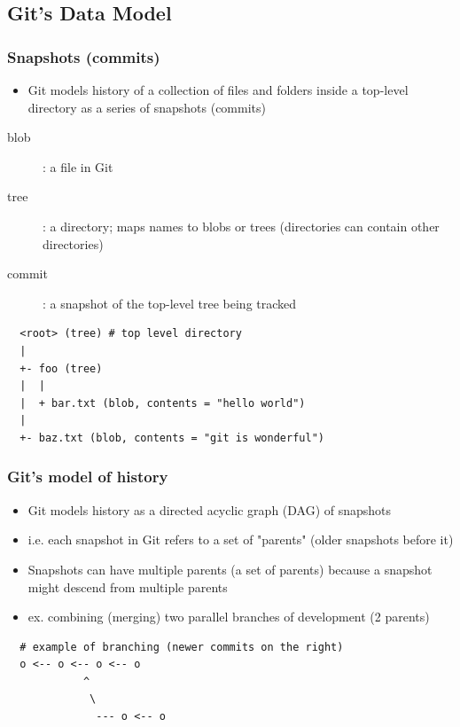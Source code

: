 \documentclass[letterpaper,12pt]{article}
\begin{document}
\subsection{Git's Data Model}

\subsubsection{Snapshots (commits)}
\begin{itemize}
 \item Git models history of a collection of files and folders inside a top-level directory as a series of snapshots (commits)
\end{itemize}

\begin{description}
 \item[blob]: a file in Git
 \item[tree]: a directory; maps names to blobs or trees (directories can contain other directories)
 \item[commit]: a snapshot of the top-level tree being tracked
\end{description}

\begin{lstlisting}
  <root> (tree) # top level directory
  |
  +- foo (tree)
  |  |
  |  + bar.txt (blob, contents = "hello world")
  |
  +- baz.txt (blob, contents = "git is wonderful")
\end{lstlisting}

\subsubsection{Git's model of history}
\begin{itemize}
 \item Git models history as a directed acyclic graph (DAG) of snapshots
 \item i.e. each snapshot in Git refers to a set of "parents" (older snapshots before it)
 \item Snapshots can have multiple parents (a set of parents) because a snapshot might descend from multiple parents
 \item ex. combining (merging) two parallel branches of development (2 parents)
\end{itemize}


\begin{lstlisting}
  # example of branching (newer commits on the right)
  o <-- o <-- o <-- o
            ^
             \
              --- o <-- o
\end{lstlisting}
\end{document}
